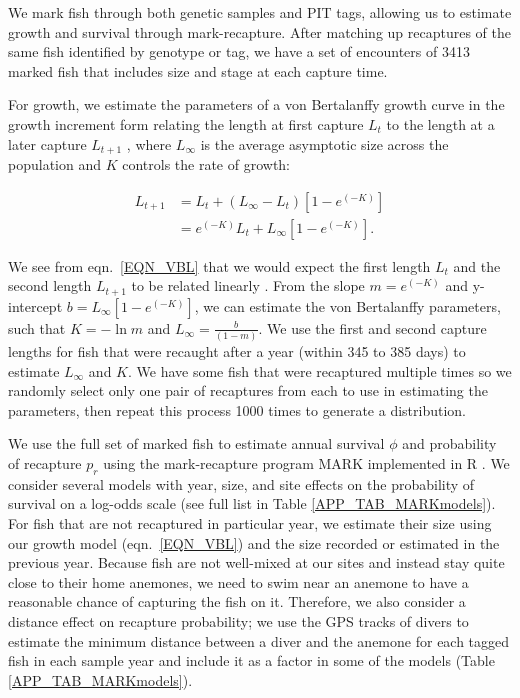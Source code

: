 \documentclass[12pt, oneside]{article}   	%
\begin{document}
We mark fish through both genetic samples and PIT tags, allowing us to estimate growth and survival through mark-recapture. After matching up recaptures of the same fish identified by genotype or tag, we have a set of encounters of 3413 marked fish that includes size and stage at each capture time.

For growth, we estimate the parameters of a von Bertalanffy growth curve \citep{fabens1965properties} in the growth increment form relating the length at first capture $L_t$ to the length at a later capture $L_{t+1}$ \citep{hart2009estimating}, where $L_\infty$ is the average asymptotic size across the population and $K$ controls the rate of growth: %

\begin{equation} \label{EQN_VBL} 
\begin{split}
L_{t+1} & = L_t + (L_\infty - L_t)[1 - e^{(-K)}] \\
 & = e^{(-K)}L_t + L_\infty[1 - e^{(-K)}].
\end{split}
\end{equation}

We see from eqn.\ \ref{EQN_VBL} that we would expect the first length $L_t$ and the second length $L_{t+1}$ to be related linearly \citep{hart2009estimating}. From the slope $m = e^{(-K)}$ and y-intercept $b =  L_\infty[1 - e^{(-K)}]$, we can estimate the von Bertalanffy parameters, such that $K = -\ln m$ and $L_\infty = \frac{b}{(1-m)}$. We use the first and second capture lengths for fish that were recaught after a year (within 345 to 385 days) to estimate $L_\infty$ and $K$. We have some fish that were recaptured multiple times so we randomly select only one pair of recaptures from each to use in estimating the parameters, then repeat this process 1000 times to generate a distribution. 

We use the full set of marked fish to estimate annual survival $\phi$ and probability of recapture $p_r$ using the mark-recapture program MARK implemented in R \citep{RMark_Laake2013}. We consider several models with year, size, and site effects on the probability of survival on a log-odds scale (see full list in Table \ref{APP_TAB_MARKmodels}). For fish that are not recaptured in particular year, we estimate their size using our growth model (eqn.\ \ref{EQN_VBL}) and the size recorded or estimated in the previous year. Because fish are not well-mixed at our sites and instead stay quite close to their home anemones, we need to swim near an anemone to have a reasonable chance of capturing the fish on it. Therefore, we also consider a distance effect on recapture probability; we use the GPS tracks of divers to estimate the minimum distance between a diver and the anemone for each tagged fish in each sample year and include it as a factor in some of the models (Table \ref{APP_TAB_MARKmodels}). 
\end{document}
